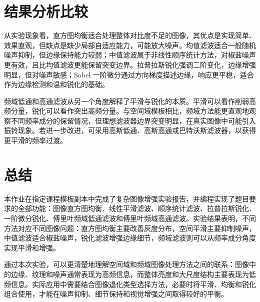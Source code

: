 \documentclass[bwprint]{report}
\begin{document}
\section{结果分析比较}
从实验现象看，直方图均衡适合处理整体对比度不足的图像，其优点是实现简单、效果直观，但缺点是缺少局部自适应能力，可能放大噪声。均值滤波适合一般随机噪声抑制，但边缘保持能力较弱；中值滤波属于非线性顺序统计方法，对椒盐噪声更有效，且比均值滤波更能保留突变边界。拉普拉斯锐化强调二阶变化，边缘增强明显，但对噪声敏感；Sobel 一阶微分通过方向梯度描述边缘，响应更平稳，适合作为边缘检测和温和锐化的基础。

频域低通和高通滤波从另一个角度解释了平滑与锐化的本质。平滑可以看作削弱高频分量，锐化可以看作突出高频分量。与空间域模板相比，频域方法能更直观地观察不同频率成分的保留情况，但理想滤波器边界突变明显，在真实图像中可能引入振铃现象。若进一步改进，可采用高斯低通、高斯高通或巴特沃斯滤波器，以获得更平滑的频率过渡。

\section{总结}
本作业在指定课程模板副本中完成了复杂图像增强实验报告，并编程实现了题目要求的全部功能：图像直方图均衡、线性平滑滤波、顺序统计滤波、拉普拉斯锐化、一阶微分锐化、傅里叶频域低通滤波和傅里叶频域高通滤波。实验结果表明，不同方法对应不同图像问题：直方图均衡主要改善灰度分布，空间平滑主要抑制噪声，中值滤波适合椒盐噪声，锐化滤波增强边缘细节，频域滤波则可以从频率成分角度实现平滑和增强。

通过本次实验，可以更清楚地理解空间域和频域图像处理方法之间的联系：图像中的边缘、纹理和噪声通常表现为高频信息，而整体亮度和大尺度结构主要表现为低频信息。实际应用中需要结合图像退化类型选择方法，必要时将平滑、均衡和锐化组合使用，才能在噪声抑制、细节保持和视觉增强之间取得较好的平衡。
\end{document}
